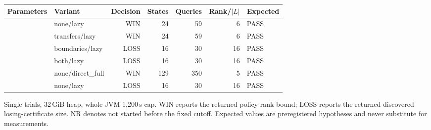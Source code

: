 \begin{longtable}{llrrrrl}
\toprule
Parameters & Variant & Decision & States & Queries & Rank/$|L|$ & Expected \\
\midrule
\endhead
 & none/lazy & WIN & 24 & 59 & 6 & PASS \\
 & transfers/lazy & WIN & 24 & 59 & 6 & PASS \\
 & boundaries/lazy & LOSS & 16 & 30 & 16 & PASS \\
 & both/lazy & LOSS & 16 & 30 & 16 & PASS \\
 & none/direct\_full & WIN & 129 & 350 & 5 & PASS \\
 & none/lazy & LOSS & 16 & 30 & 16 & PASS \\
\bottomrule
\end{longtable}
{\par\smallskip\footnotesize Single trials, 32\,GiB heap, whole-JVM 1,200\,s cap. WIN reports the returned policy rank bound; LOSS reports the returned discovered losing-certificate size. NR denotes not started before the fixed cutoff. Expected values are preregistered hypotheses and never substitute for measurements.}
